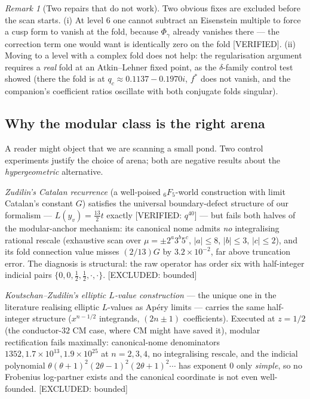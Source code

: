 \documentclass[11pt,reqno]{amsart}
\theoremstyle{plain}
\theoremstyle{definition}
\theoremstyle{remark}
\newtheorem{remark}[theorem]{Remark}
\newcommand{\Verified}{\textup{\textsf{[VERIFIED]}}}
\newcommand{\VerifiedR}[1]{\textup{\textsf{[VERIFIED: #1]}}}
\newcommand{\ExcludedR}[1]{\textup{\textsf{[EXCLUDED: #1]}}}
\begin{document}
\begin{remark}[Two repairs that do not work]
Two obvious fixes are excluded before the scan starts. (i) At level $6$
one cannot subtract an Eisenstein multiple to force a cusp form to vanish
at the fold, because $\Phi_\gamma$ already vanishes there --- the
correction term one would want is identically zero on the fold
\Verified. (ii) Moving to a level with a complex fold does not help: the
regularisation argument requires a \emph{real} fold at an Atkin--Lehner
fixed point, as the $\delta$-family control test showed (there the fold
is at $q_c\approx 0.1137-0.1970i$, $f^{*}$ does not vanish, and the
companion's coefficient ratios oscillate with both conjugate folds
singular).
\end{remark}

\subsection{Why the modular class is the right arena}

A reader might object that we are scanning a small pond. Two control
experiments justify the choice of arena; both are negative results about
the \emph{hypergeometric} alternative.

\emph{Zudilin's Catalan recurrence} (a well-poised ${}_6F_5$-world
construction with limit Catalan's constant $G$) satisfies the universal
boundary-defect structure of our formalism --- $L(y_v)=\tfrac{13}{2}t$
exactly \VerifiedR{$q^{40}$} --- but fails both halves of the
modular-anchor mechanism: its canonical nome admits \emph{no} integralising
rational rescale (exhaustive scan over $\mu=\pm2^a3^b5^c$, $|a|\le8$,
$|b|\le3$, $|c|\le2$), and its fold connection value misses $(2/13)G$ by
$3.2\times10^{-2}$, far above truncation error. The diagnosis is
structural: the raw operator has order six with half-integer indicial
pairs $\{0,0,\tfrac12,\tfrac12,\cdot,\cdot\}$. \ExcludedR{bounded}

\emph{Koutschan--Zudilin's elliptic $L$-value construction} --- the unique
one in the literature realising elliptic $L$-values as Ap\'ery limits ---
carries the same half-integer structure ($x^{n-1/2}$ integrands,
$(2n\pm1)$ coefficients). Executed at $z=1/2$ (the conductor-$32$ CM
case, where CM might have saved it), modular rectification fails
maximally: canonical-nome denominators $1352, 1.7\times10^{13},
1.9\times10^{25}$ at $n=2,3,4$, no integralising rescale, and the
indicial polynomial $\theta(\theta+1)^2(2\theta-1)^2(2\theta+1)^2\cdots$
has exponent $0$ only \emph{simple}, so no Frobenius log-partner exists
and the canonical coordinate is not even well-founded. \ExcludedR{bounded}
\end{document}
